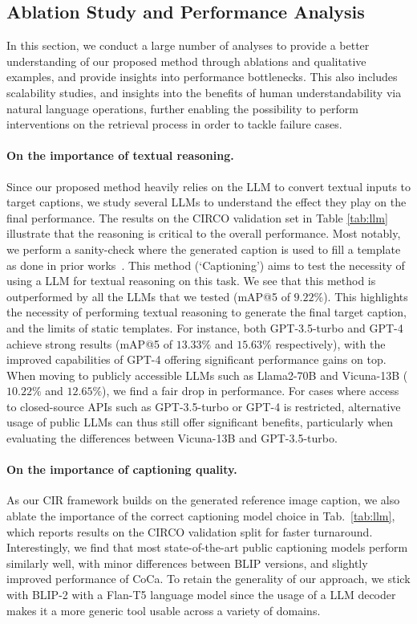 \documentclass{article} \usepackage{iclr2024_conference,times}
\begin{document}
\subsection{Ablation Study and Performance Analysis}
\label{subsec:analysis}
In this section, we conduct a large number of analyses to provide a better understanding of our proposed method through ablations and qualitative examples, and provide insights into performance bottlenecks. This also includes scalability studies, and insights into the benefits of human understandability via natural language operations, further enabling the possibility to perform interventions on the retrieval process in order to tackle failure cases.

\paragraph{On the importance of textual reasoning.} Since our proposed method heavily relies on the LLM to convert textual inputs to target captions, we study several LLMs to understand the effect they play on the final performance. The results on the CIRCO validation set in Table \ref{tab:llm} illustrate that the reasoning is critical to the overall performance. Most notably, we perform a sanity-check where the generated caption is used to fill a template as done in prior works~\citep{pic2word,searle}. This method (`Captioning') aims to test the necessity of using a LLM for textual reasoning on this task. We see that this method is outperformed by all the LLMs that we tested (mAP@5 of $9.22\%$). This highlights the necessity of performing textual reasoning to generate the final target caption, and the limits of static templates. For instance, both GPT-3.5-turbo and GPT-4 achieve strong results (mAP@5 of $13.33\%$ and $15.63\%$ respectively), with the improved capabilities of GPT-4 offering significant performance gains on top. When moving to publicly accessible LLMs such as Llama2-70B and Vicuna-13B ($10.22\%$ and $12.65\%$), we find a fair drop in performance. For cases where access to closed-source APIs such as GPT-3.5-turbo or GPT-4 is restricted, alternative usage of public LLMs can thus still offer significant benefits, particularly when evaluating the differences between Vicuna-13B and GPT-3.5-turbo.

\paragraph{On the importance of captioning quality.} As our CIR framework builds on the generated reference image caption, we also ablate the importance of the correct captioning model choice in Tab.~\ref{tab:llm}, which reports results on the CIRCO validation split for faster turnaround. 
Interestingly, we find that most state-of-the-art public captioning models perform similarly well, with minor differences between BLIP versions, and slightly improved performance of CoCa. To retain the generality of our approach, we stick with BLIP-2 with a Flan-T5 language model since the usage of a LLM decoder makes it a more generic tool usable across a variety of domains.
\end{document}
